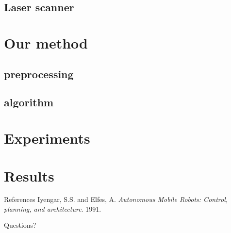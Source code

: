 \documentclass{beamer}
\begin{document}
\subsection{Laser scanner}

\section{Our method}
\subsection{preprocessing}
\subsection{algorithm}

\section{Experiments}

\section{Results}

\begin{thebibliography}{9}

	\begin{frame}{References}
			Iyengar, S.S. and Elfes, A.
			\emph{Autonomous Mobile Robots: Control, planning, and architecture}.
			1991.
			
 	\end{frame}
 	
	\begin{frame}{}
	\begin{alertblock}{}
		\center
		Questions?
	\end{alertblock}
	\end{frame} 	
 	
\end{thebibliography}
 	
\end{document}
